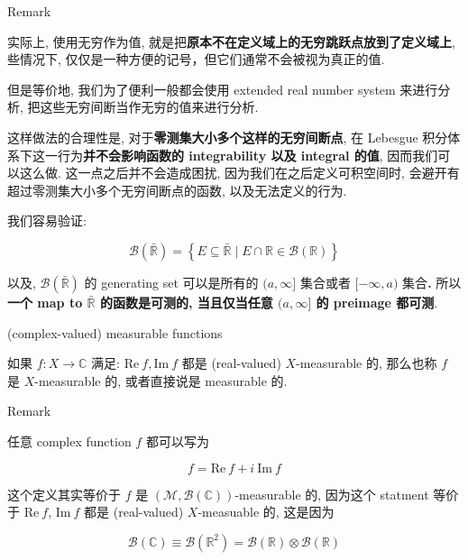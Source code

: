 \documentclass{qlnotes-export}
\begin{document}
\begin{qlremark}{Remark}

实际上, 使用无穷作为值, 就是把\textbf{原本不在定义域上的无穷跳跃点放到了定义域上}, 些情况下, 仅仅是一种方便的记号，但它们通常不会被视为真正的值.

但是等价地, 我们为了便利一般都会使用 extended real number system 来进行分析, 把这些无穷间断当作无穷的值来进行分析.

这样做法的合理性是, 对于\textbf{零测集大小多个这样的无穷间断点}, 在 Lebesgue 积分体系下这一行为\textbf{并不会影响函数的 integrability 以及 integral 的值}, 因而我们可以这么做. 这一点之后并不会造成困扰, 因为我们在之后定义可积空间时, 会避开有超过零测集大小多个无穷间断点的函数, 以及无法定义的行为.

我们容易验证:

\[\mathcal{B}(\bar{\mathbb{R}}) = \left\{ {E \subseteq \bar{\mathbb{R}} \mid E \cap {\mathbb{R}} \in \mathcal{B}({\mathbb{R}})} \right\}\]

以及, \(\mathcal{B}(\bar{\mathbb{R}})\) 的 generating set 可以是所有的 \((a,\infty\rbrack\) 集合或者 \(\lbrack - \infty,a)\) 集合\textbf{.} 所以\textbf{一个 map to \(\bar{\mathbb{R}}\) 的函数是可测的, 当且仅当任意 \((a,\infty\rbrack\) 的 preimage 都可测}.\\

\end{qlremark}

\begin{definition}{(complex-valued) measurable functions}\label{def-04-measurable-functions-and-integration-on-l-mu-complex-valued-measurable-functions}

如果 \(f:X\rightarrow{\mathbb{C}}\) 满足: \(\text{Re}\ f,\text{Im}\ f\) 都是 (real-valued) \(X\)-measurable 的, 那么也称 \(f\) 是 \(X\)-measurable 的, 或者直接说是 measurable 的.

\end{definition}

\begin{qlremark}{Remark}

任意 complex function \(f\) 都可以写为

\[f = \text{Re}\ f + i\ \text{Im}\ f\]

这个定义其实等价于 \(f\) 是 \((\mathcal{M},\mathcal{B}({\mathbb{C}}))\)-measurable 的, 因为这个 statment 等价于 \(\text{Re}\ f\), \(\text{Im}\ f\) 都是 (real-valued) \(X\)-measuable 的, 这是因为

\[\mathcal{B}({\mathbb{C}}) \equiv \mathcal{B}({\mathbb{R}}^{2}) = \mathcal{B}({\mathbb{R}}) \otimes \mathcal{B}({\mathbb{R}})\]

\end{qlremark}
\end{document}
